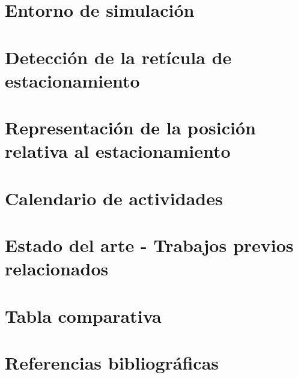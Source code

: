 \documentclass[11pt,letterpaper,final]{article}
\begin{document}
    \section*{Entorno de simulación}
    
    \clearpage

    \section*{Detección de la retícula de estacionamiento}
    
    \clearpage


    \section*{Representación de la posición relativa al estacionamiento}
    
    \clearpage


    \section*{Calendario de actividades}
    
    \clearpage

    \section*{Estado del arte - Trabajos previos relacionados}
    

    \section*{Tabla comparativa}
    
    \clearpage

    \section*{Referencias bibliográficas}
    
    
\end{document}

